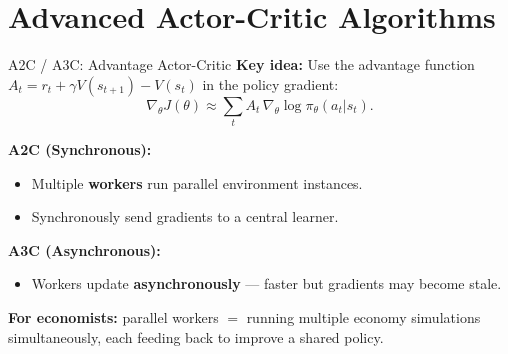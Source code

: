 \documentclass[10pt,english,aspectratio=169]{beamer}
\begin{document}
\section{Advanced Actor-Critic Algorithms}

\begin{frame}{A2C / A3C: Advantage Actor-Critic}
    \textbf{Key idea:} Use the advantage function $A_t = r_t + \gamma V(s_{t+1}) - V(s_t)$
    in the policy gradient:
    \[
      \nabla_\theta J(\theta) \approx \sum_t A_t \, \nabla_\theta \log \pi_\theta(a_t | s_t).
    \]

    \vspace{0.3cm}
    \textbf{A2C (Synchronous):}
    \begin{itemize}
        \item Multiple \textbf{workers} run parallel environment instances.
        \item Synchronously send gradients to a central learner.
    \end{itemize}

    \vspace{0.2cm}
    \textbf{A3C (Asynchronous):}
    \begin{itemize}
        \item Workers update \textbf{asynchronously} --- faster but gradients may become stale.
    \end{itemize}

    \vspace{0.3cm}
    \textbf{For economists:} parallel workers $=$ running multiple economy simulations simultaneously, each feeding back to improve a shared policy.
\end{frame}
\end{document}
